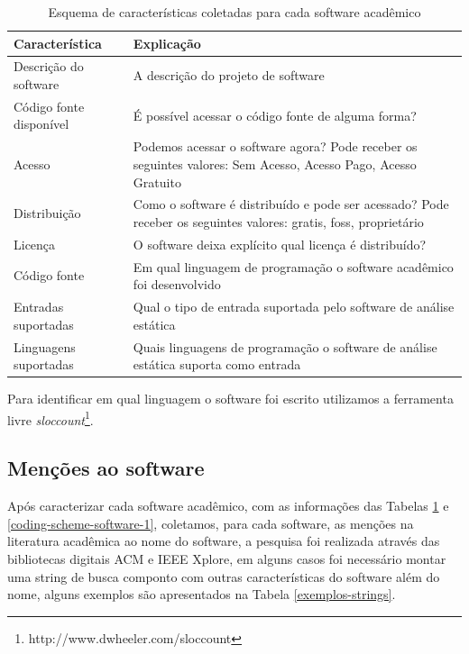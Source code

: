 \begin{table}[h]
\caption{Esquema de características coletadas para cada software acadêmico}
\centering
\begin{tabular}{ l p{11cm} }
  \hline
  Característica           & Explicação \\
  \hline
  Descrição do software    & A descrição do projeto de software \\
  Código fonte disponível  & É possível acessar o código fonte de alguma forma? \\
  Acesso                   & Podemos acessar o software agora? Pode receber os seguintes valores: Sem Acesso, Acesso Pago, Acesso Gratuito \\
  Distribuição             & Como o software é distribuído e pode ser acessado? Pode receber os seguintes valores: gratis, foss, proprietário \\
  Licença                  & O software deixa explícito qual licença é distribuído? \\
  Código fonte             & Em qual linguagem de programação o software acadêmico foi desenvolvido \\
  Entradas suportadas      & Qual o tipo de entrada suportada pelo software de análise estática \\
  Linguagens suportadas    & Quais linguagens de programação o software de análise estática suporta como entrada \\
  \hline
\end{tabular}
\label{coding-scheme-software}
\end{table}

Para identificar em qual linguagem o software foi escrito utilizamos a
ferramenta livre {\it sloccount}\footnote{http://www.dwheeler.com/sloccount}.

\subsection{Menções ao software}

Após caracterizar cada software acadêmico, com as informações das Tabelas
\ref{coding-scheme-software} e \ref{coding-scheme-software-1}, coletamos, para
cada software, as menções na literatura acadêmica ao nome do software, a
pesquisa foi realizada através das bibliotecas digitais ACM e IEEE Xplore, em
alguns casos foi necessário montar uma string de busca componto com outras
características do software além do nome, alguns exemplos são apresentados na
Tabela \ref{exemplos-strings}.

